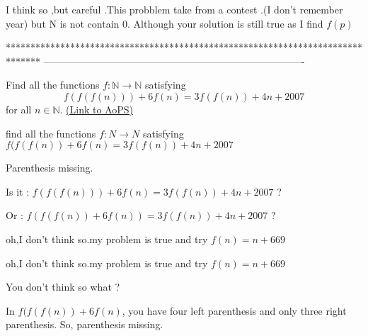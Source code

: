 \begin{mysolution}
	I think so ,but careful .This probblem take from a contest .(I don't remember year) but N is not contain 0. 
Although your solution is still true as I find $ f(p)$ 
\end{mysolution}
*******************************************************************************
-------------------------------------------------------------------------------

\begin{problem}
	Find all the functions $f: \mathbb N \to \mathbb N$ satisfying
\[f(f(f(n)))+6f(n)=3f(f(n))+4n+2007\]
for all $n \in \mathbb N$.
	\flushright \href{https://artofproblemsolving.com/community/c6h178149}{(Link to AoPS)}
\end{problem}



\begin{mysolution}
	\begin{tcolorbox}find all the functions $ f: N\rightarrow N$ satisfying
$ f(f(f(n)) + 6f(n) = 3f(f(n)) + 4n + 2007$\end{tcolorbox}

Parenthesis missing. 

Is it : $ f(f(f(n))) + 6f(n) = 3f(f(n)) + 4n + 2007$ ?

Or : $ f(f(f(n)) + 6f(n)) = 3f(f(n)) + 4n + 2007$ ?
\end{mysolution}



\begin{mysolution}
	oh,I don't think so.my problem is true and try $ f(n)=n+669$
\end{mysolution}



\begin{mysolution}
	\begin{tcolorbox}oh,I don't think so.my problem is true and try $ f(n) = n + 669$\end{tcolorbox}

You don't think so what ?

In $ f(f(f(n))+6f(n)$, you have four left parenthesis and only three right parenthesis. So, parenthesis missing.
\end{mysolution}



